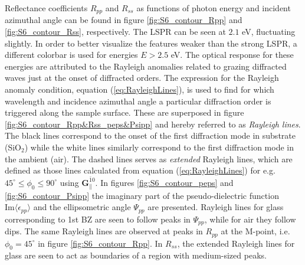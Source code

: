 Reflectance coefficients $R_{pp}$ and $R_{ss}$ as functions of photon energy and incident azimuthal angle can be found in figure \ref{fig:S6_contour_Rpp} and \ref{fig:S6_contour_Rss}, respectively. The LSPR can be seen at $2.1$ eV, fluctuating slightly. In order to better visualize the features weaker than the strong LSPR, a different colorbar is used for energies $E>2.5$ eV. The optical response for these energies are attributed to the Rayleigh anomalies related to grazing diffracted waves just at the onset of diffracted orders\cite{Brakstad:15}. The expression for the Rayleigh anomaly condition, equation (\ref{eq:RayleighLines}), is used to find for which wavelength and incidence azimuthal angle a particular diffraction order is triggered along the sample surface. These are superposed in figure \ref{fig:S6_contour_Rpp&Rss_peps&Psipp} and hereby referred to as \emph{Rayleigh lines}. The black lines correspond to the onset of the first diffraction mode in substrate (SiO$_2$) while the white lines similarly correspond to the first diffraction mode in the ambient (air). The dashed lines serves as \emph{extended} Rayleigh lines, which are defined as those lines calculated from equation (\ref{eq:RayleighLines}) for e.g. $45^\circ \leq \phi_0 \leq 90^\circ$ using $\mathbf{G}_\parallel^{\bar{1}0}$. In figures \ref{fig:S6_contour_peps} and \ref{fig:S6_contour_Psipp} the imaginary part of the pseudo-dielectric function $\text{Im}\langle\epsilon_{pp}\rangle$ and the ellipsometric angle $\Psi_{pp}$ are presented. Rayleigh lines for glass corresponding to 1st BZ are seen to follow peaks in $\Psi_{pp}$, while for air they follow dips. The same Rayleigh lines are observed at peaks in $R_{pp}$ at the M-point, i.e. $\phi_0=45^\circ$ in figure \ref{fig:S6_contour_Rpp}. In $R_{ss}$, the extended Rayleigh lines for glass are seen to act as boundaries of a region with medium-sized peaks.


